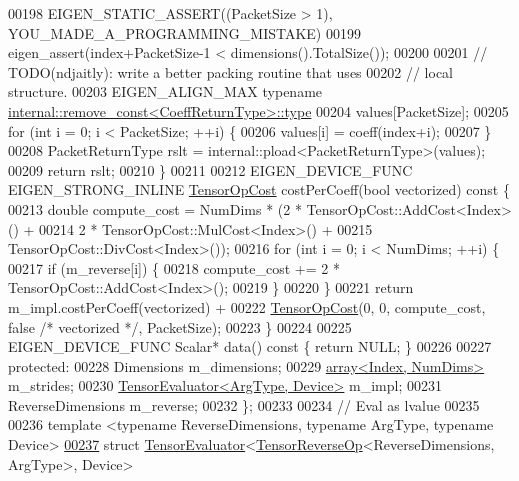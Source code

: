 \begin{DoxyCode}
00198     EIGEN\_STATIC\_ASSERT((PacketSize > 1), YOU\_MADE\_A\_PROGRAMMING\_MISTAKE)
00199     eigen\_assert(index+PacketSize-1 < dimensions().TotalSize());
00200 
00201     \textcolor{comment}{// TODO(ndjaitly): write a better packing routine that uses}
00202     \textcolor{comment}{// local structure.}
00203     EIGEN\_ALIGN\_MAX \textcolor{keyword}{typename} \hyperlink{group___sparse_core___module}{internal::remove\_const<CoeffReturnType>::type}
00204                                                             values[PacketSize];
00205     \textcolor{keywordflow}{for} (\textcolor{keywordtype}{int} i = 0; i < PacketSize; ++i) \{
00206       values[i] = coeff(index+i);
00207     \}
00208     PacketReturnType rslt = internal::pload<PacketReturnType>(values);
00209     \textcolor{keywordflow}{return} rslt;
00210   \}
00211 
00212   EIGEN\_DEVICE\_FUNC EIGEN\_STRONG\_INLINE \hyperlink{class_eigen_1_1_tensor_op_cost}{TensorOpCost} costPerCoeff(\textcolor{keywordtype}{bool} vectorized)\textcolor{keyword}{ const }\{
00213     \textcolor{keywordtype}{double} compute\_cost = NumDims * (2 * TensorOpCost::AddCost<Index>() +
00214                                      2 * TensorOpCost::MulCost<Index>() +
00215                                      TensorOpCost::DivCost<Index>());
00216     \textcolor{keywordflow}{for} (\textcolor{keywordtype}{int} i = 0; i < NumDims; ++i) \{
00217       \textcolor{keywordflow}{if} (m\_reverse[i]) \{
00218         compute\_cost += 2 * TensorOpCost::AddCost<Index>();
00219       \}
00220     \}
00221     \textcolor{keywordflow}{return} m\_impl.costPerCoeff(vectorized) +
00222            \hyperlink{class_eigen_1_1_tensor_op_cost}{TensorOpCost}(0, 0, compute\_cost, \textcolor{keyword}{false} \textcolor{comment}{/* vectorized */}, PacketSize);
00223   \}
00224 
00225   EIGEN\_DEVICE\_FUNC Scalar* data()\textcolor{keyword}{ const }\{ \textcolor{keywordflow}{return} NULL; \}
00226 
00227  \textcolor{keyword}{protected}:
00228   Dimensions m\_dimensions;
00229   \hyperlink{class_eigen_1_1array}{array<Index, NumDims>} m\_strides;
00230   \hyperlink{struct_eigen_1_1_tensor_evaluator}{TensorEvaluator<ArgType, Device>} m\_impl;
00231   ReverseDimensions m\_reverse;
00232 \};
00233 
00234 \textcolor{comment}{// Eval as lvalue}
00235 
00236 \textcolor{keyword}{template} <\textcolor{keyword}{typename} ReverseDimensions, \textcolor{keyword}{typename} ArgType, \textcolor{keyword}{typename} Device>
\hyperlink{struct_eigen_1_1_tensor_evaluator_3_01_tensor_reverse_op_3_01_reverse_dimensions_00_01_arg_type_01_4_00_01_device_01_4}{00237} \textcolor{keyword}{struct }\hyperlink{struct_eigen_1_1_tensor_evaluator}{TensorEvaluator}<\hyperlink{class_eigen_1_1_tensor_reverse_op}{TensorReverseOp}<ReverseDimensions, ArgType>, Device>

\end{DoxyCode}
